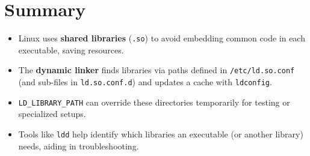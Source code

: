\documentclass[a4paper]{report}
\begin{document}
\section*{Summary}

\begin{itemize}
    \item Linux uses \textbf{shared libraries} (\texttt{.so}) to avoid embedding common code in each executable, saving resources.
    \item The \textbf{dynamic linker} finds libraries via paths defined in \texttt{/etc/ld.so.conf} (and sub-files in \texttt{ld.so.conf.d}) and updates a cache with \texttt{ldconfig}.
    \item \texttt{LD\_LIBRARY\_PATH} can override these directories temporarily for testing or specialized setups.
    \item Tools like \texttt{ldd} help identify which libraries an executable (or another library) needs, aiding in troubleshooting.
\end{itemize}



\newpage
\end{document}
